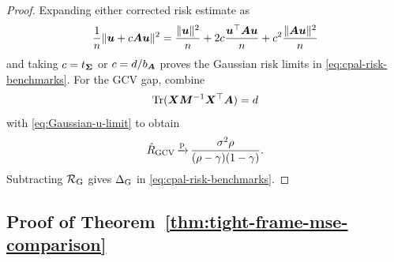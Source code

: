 \documentclass{article}
\theoremstyle{plain} %
\theoremstyle{definition} %
\theoremstyle{definition} %
\newcommand{\GCV}{{\text{GCV}}}
\newcommand{\hR}{\hat{R}}
\begin{document}
\begin{proof}
Expanding either corrected risk estimate as
\begin{align*}
    \frac1n\lVert\boldsymbol{u}+c\boldsymbol{A}\boldsymbol{u}\rVert^2
    =\frac{\lVert\boldsymbol{u}\rVert^2}{n}
     +2c\frac{\boldsymbol{u}^\top\boldsymbol{A}\boldsymbol{u}}{n}
     +c^2\frac{\lVert\boldsymbol{A}\boldsymbol{u}\rVert^2}{n}
\end{align*}
and taking $c=t_{\boldsymbol{\Sigma}}$ or $c=d/b_{\boldsymbol{A}}$ proves the Gaussian
risk limits in \eqref{eq:cpal-risk-benchmarks}. For the GCV gap, combine
\begin{align*}
    \operatorname{Tr}(\boldsymbol{X}\boldsymbol{M}^{-1}\boldsymbol{X}^\top\boldsymbol{A})=d
\end{align*}
with \eqref{eq:Gaussian-u-limit} to obtain
\begin{align*}
    \hR_{\GCV}
    \limp
    \frac{\sigma^2\rho}{(\rho-\gamma)(1-\gamma)}.
\end{align*}
Subtracting ${\mathcal R}_{\rm G}$ gives $\Delta_{\rm G}$ in
\eqref{eq:cpal-risk-benchmarks}.
\end{proof}

\subsection{Proof of Theorem~\ref{thm:tight-frame-mse-comparison}}
\label{app:proof-tight-frame-mse-comparison}
\end{document}
